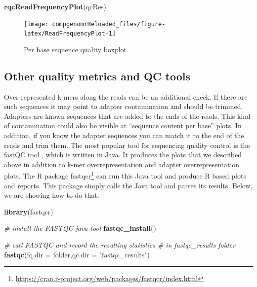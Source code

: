 \documentclass[12pt,]{krantz}
\newenvironment{Shaded}{\begin{snugshade}}{\end{snugshade}}
\newcommand{\CommentTok}[1]{\textcolor[rgb]{0.56,0.35,0.01}{\textit{#1}}}
\newcommand{\DataTypeTok}[1]{\textcolor[rgb]{0.13,0.29,0.53}{#1}}
\newcommand{\KeywordTok}[1]{\textcolor[rgb]{0.13,0.29,0.53}{\textbf{#1}}}
\newcommand{\NormalTok}[1]{#1}
\newcommand{\StringTok}[1]{\textcolor[rgb]{0.31,0.60,0.02}{#1}}
\renewcommand{\href}[2]{#2\footnote{\url{#1}}}
\begin{document}
\begin{Shaded}
\begin{Highlighting}[]
\KeywordTok{rqcReadFrequencyPlot}\NormalTok{(qcRes)}
\end{Highlighting}
\end{Shaded}

\begin{figure}

{\centering \texttt{[image: compgenomrReloaded\_files/figure-latex/ReadFrequencyPlot-1]} 

}

\caption{Per base sequence quality boxplot}\label{fig:ReadFrequencyPlot}
\end{figure}

\hypertarget{other-quality-metrics-and-qc-tools}{%
\subsection{Other quality metrics and QC tools}\label{other-quality-metrics-and-qc-tools}}

Over-represented k-mers along the reads can be an additional check. If there are such sequences it may point to adapter contamination and should be trimmed. Adapters are known sequences that are added to the ends of the reads. This kind of contamination could also be visible at ``sequence content per base'' plots. In addition, if you know the adapter sequences you can match it to the end of the reads and trim them. The most popular tool for sequencing quality control is the fastQC tool \citep{noauthor_babraham_nodate}, which is written in Java. It produces the plots that we described above in addition to k-mer overrepresentation and adapter overrepresentation plots. The R package \href{https://cran.r-project.org/web/packages/fastqcr/index.html}{fastqcr} can run this Java tool and produce R based plots and reports. This package simply calls the Java tool and parses its results. Below, we are showing how to do that.

\begin{Shaded}
\begin{Highlighting}[]
\KeywordTok{library}\NormalTok{(fastqcr)}

\CommentTok{# install the FASTQC java tool}
\KeywordTok{fastqc_install}\NormalTok{()}

\CommentTok{# call FASTQC and record the resulting statistics}
\CommentTok{# in fastqc_results folder}
\KeywordTok{fastqc}\NormalTok{(}\DataTypeTok{fq.dir =}\NormalTok{ folder,}\DataTypeTok{qc.dir =} \StringTok{"fastqc_results"}\NormalTok{)}
\end{Highlighting}
\end{Shaded}
\end{document}
